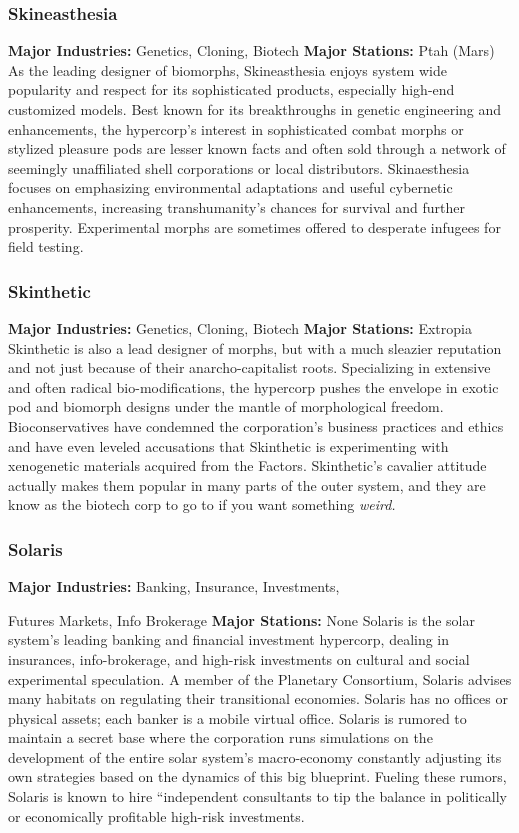 \subsubsection{Skineasthesia}

\textbf{Major Industries:} Genetics, Cloning, Biotech
\textbf{Major Stations:} Ptah (Mars)
As the leading designer of biomorphs, Skineasthesia 
enjoys system wide popularity and respect for its 
sophisticated products, especially high-end customized 
models. Best known for its breakthroughs in genetic 
engineering and enhancements, the hypercorp's 
interest in sophisticated combat morphs or stylized 
pleasure pods are lesser known facts and often sold 
through a network of seemingly unaffiliated shell corporations
or local distributors. Skinaesthesia focuses
on emphasizing environmental adaptations and useful 
cybernetic enhancements, increasing transhumanity's 
chances for survival and further prosperity. Experimental
morphs are sometimes offered to desperate
infugees for field testing.

\subsubsection{Skinthetic}

\textbf{Major Industries:} Genetics, Cloning, Biotech
\textbf{Major Stations:} Extropia
Skinthetic is also a lead designer of morphs, but with 
a much sleazier reputation and not just because of 
their anarcho-capitalist roots. Specializing in extensive
and often radical bio-modifications, the hypercorp
pushes the envelope in exotic pod and biomorph
designs under the mantle of morphological freedom. 
Bioconservatives have condemned the corporation's 
business practices and ethics and have even leveled 
accusations that Skinthetic is experimenting with 
xenogenetic materials acquired from the Factors. 
Skinthetic's cavalier attitude actually makes them 
popular in many parts of the outer system, and they 
are know as the biotech corp to go to if you want 
something \textit{weird.}

\subsubsection{Solaris}

\textbf{Major Industries:} Banking, Insurance, Investments, 

Futures Markets, Info Brokerage
\textbf{Major Stations:} None
Solaris is the solar system's leading banking and financial
investment hypercorp, dealing in insurances,
info-brokerage, and high-risk investments on cultural 
and social experimental speculation. A member of the 
Planetary Consortium, Solaris advises many habitats 
on regulating their transitional economies. Solaris has 
no offices or physical assets; each banker is a mobile 
virtual office. Solaris is rumored to maintain a secret 
base where the corporation runs simulations on the 
development of the entire solar system's macro-economy
constantly adjusting its own strategies based
on the dynamics of this big blueprint. Fueling these 
rumors, Solaris is known to hire ``independent consultants
to tip the balance in politically or economically
profitable high-risk investments.

